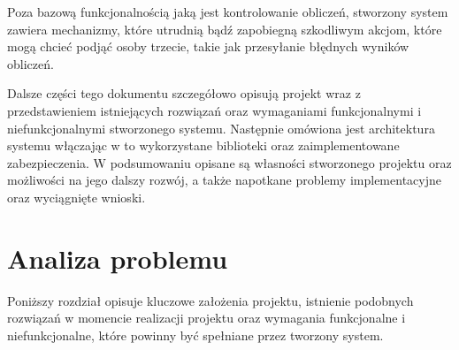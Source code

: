 \documentclass[a4paper,11pt,twoside]{report}
\theoremstyle{definition}
\begin{document}
    Poza bazową funkcjonalnością jaką jest kontrolowanie obliczeń, stworzony system zawiera
    mechanizmy, które utrudnią bądź zapobiegną szkodliwym akcjom, które mogą chcieć
    podjąć osoby trzecie, takie jak przesyłanie błędnych wyników obliczeń.
    
    Dalsze części tego dokumentu szczegółowo opisują projekt wraz z przedstawieniem istniejących
    rozwiązań oraz wymaganiami funkcjonalnymi i niefunkcjonalnymi stworzonego systemu.
    Następnie omówiona jest architektura systemu włączając w to wykorzystane biblioteki oraz zaimplementowane zabezpieczenia.
    W podsumowaniu opisane są własności stworzonego projektu oraz możliwości na jego dalszy rozwój, a także napotkane problemy implementacyjne oraz wyciągnięte wnioski.

\chapter{Analiza problemu}

    Poniższy rozdział opisuje kluczowe założenia projektu, istnienie podobnych rozwiązań w momencie realizacji projektu oraz wymagania funkcjonalne i niefunkcjonalne, które powinny być spełniane przez tworzony system.
\end{document}
